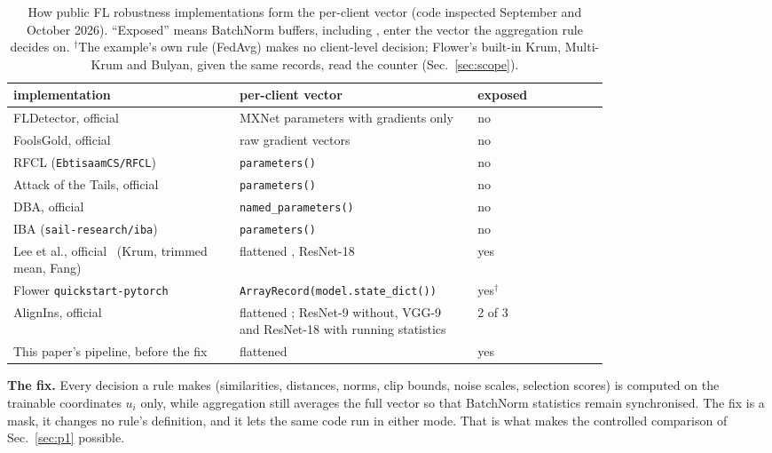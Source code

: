 \documentclass[journal]{IEEEtran}
\begin{document}
\begin{table}[t]
\centering
\caption{How public FL robustness implementations form the per-client vector
(code inspected September and October 2026). ``Exposed'' means BatchNorm buffers, including
\nbt{}, enter the vector the aggregation rule decides on. $^\dagger$The example's
own rule (FedAvg) makes no client-level decision; Flower's built-in Krum, Multi-Krum
and Bulyan, given the same records, read the counter (Sec.~\ref{sec:scope}).}
\label{tab:survey}
\small
\begin{tabular}{@{}p{0.38\linewidth}p{0.40\linewidth}l@{}}
\toprule
implementation & per-client vector & exposed \\
\midrule
FLDetector, official~\cite{zhang2022fldetector} & MXNet parameters with gradients only & no \\
FoolsGold, official~\cite{fung2020foolsgold} & raw gradient vectors & no \\
RFCL (\texttt{EbtisaamCS/RFCL}) & \texttt{parameters()} & no \\
Attack of the Tails, official~\cite{wang2020tails} & \texttt{parameters()} & no \\
DBA, official~\cite{xie2020} & \texttt{named\_parameters()} & no \\
IBA (\texttt{sail-research/iba}) & \texttt{parameters()} & no \\
Lee et al., official~\cite{lee2024triplet} (Krum, trimmed mean, Fang) & flattened \sd{}, ResNet-18 & yes \\
Flower \texttt{quickstart-pytorch}~\cite{beutel2020flower} & \texttt{ArrayRecord(model.state\_dict())} & yes$^\dagger$ \\
AlignIns, official~\cite{xu2025alignins} & flattened \sd{}; ResNet-9 without, VGG-9 and ResNet-18 with running statistics & 2 of 3 \\
This paper's pipeline, before the fix & flattened \sd{} & yes \\
\bottomrule
\end{tabular}
\end{table}

\textbf{The fix.} Every decision a rule makes (similarities, distances, norms,
clip bounds, noise scales, selection scores) is computed on the trainable
coordinates $u_i$ only, while aggregation still averages the full vector so that
BatchNorm statistics remain synchronised. The fix is a mask, it changes no
rule's definition, and it lets the same code run in either mode. That is what
makes the controlled comparison of Sec.~\ref{sec:p1} possible.
\end{document}
